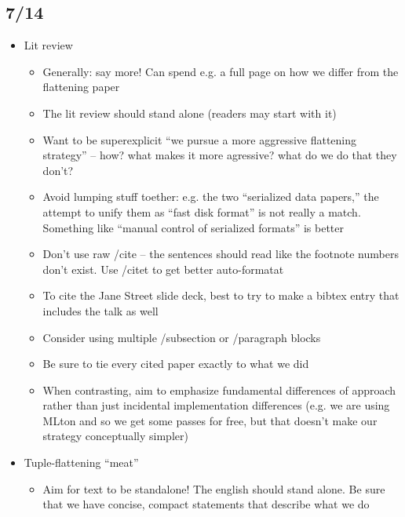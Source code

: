 \documentclass[leqno,11pt]{article}
\begin{document}
\subsection{7/14}
\begin{itemize}
\item Lit review

  \begin{itemize}

  \item Generally: say more! Can spend e.g. a full page on how we differ from
    the flattening paper

  \item The lit review should stand alone (readers may start with it)

  \item Want to be superexplicit ``we pursue a more aggressive flattening
    strategy'' -- how? what makes it more agressive? what do we do that they
    don't?

  \item Avoid lumping stuff toether: e.g. the two ``serialized data papers,''
    the attempt to unify them as ``fast disk format'' is not really a match.
    Something like ``manual control of serialized formats'' is better

  \item Don't use raw /cite -- the sentences should read like the footnote
    numbers don't exist. Use /citet to get better auto-formatat

  \item To cite the Jane Street slide deck, best to try to make a bibtex entry
    that includes the talk as well

  \item Consider using multiple /subsection or /paragraph blocks

  \item Be sure to tie every cited paper exactly to what we did

  \item When contrasting, aim to emphasize fundamental differences of approach
    rather than just incidental implementation differences (e.g. we are using
    MLton and so we get some passes for free, but that doesn't make our strategy
    conceptually simpler)

  \end{itemize}

\item Tuple-flattening ``meat''

  \begin{itemize}
  \item Aim for text to be standalone! The english should stand alone. Be sure
    that we have concise, compact statements that describe what we do


\end{itemize}
\end{itemize}
\end{document}
